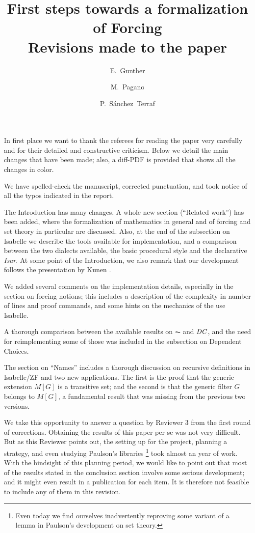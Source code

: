 \documentclass[11pt,english]{article}
\begin{document}
\title{First steps towards a formalization of Forcing
  \\ Revisions made to the paper}
\author{E.~Gunther \and  M.~Pagano \and P.~S\'anchez~Terraf
}
\date{}
\maketitle

In first place we want to thank the referees for reading the paper very
carefully and for their detailed and constructive criticism. Below we
detail the main changes that have been made; also, a diff-PDF is
provided that shows all the changes in color.

We have spelled-check the manuscript, corrected punctuation, and took
notice of all the typos indicated in the report. 

The Introduction has many changes. A whole new section (``Related
work'') has been added, where the formalization of mathematics in
general and of forcing and set theory in particular are discussed.
Also, at the end of the subsection on Isabelle we describe the tools
available for implementation, and a comparison
between the two dialects available, the basic procedural style and the
declarative \emph{Isar}. At some point of the Introduction, we also
remark that our 
development follows the presentation by Kunen \cite{kunen2011set}. 

We added several comments on the implementation details, especially in
the section on forcing notions; this includes a description of the
complexity in number of lines and proof commands, and some hints on
the mechanics of the use Isabelle.

A thorough comparison between the available results on $\AC$ and
$\mathit{DC}$, and the need for reimplementing some of those was included in
the subsection on Dependent Choices.

The section on ``Names'' includes a thorough discussion on recursive
definitions in Isabelle/ZF and two new applications. The first is the proof
that the generic extension $M[G]$ is a transitive set; and the second
is that the generic filter $G$ belongs to $M[G]$, a fundamental result
that was missing from the previous two versions.

We take this opportunity to answer a question by Reviewer 3 from the
first round of corrections. Obtaining the results of this paper per se
was not very difficult. But as this Reviewer points out, the setting
up for the project, planning a strategy, and even studying Paulson's
libraries%
\footnote{Even today we find ourselves inadvertently reproving some
  variant of a lemma in Paulson's development on set theory.}
took almost an year of work. With the hindsight of this planning
period, we would like to point out that most of the results stated in
the conclusion section involve some serious development; and it might
even result in a publication for each item. It is therefore not
feasible to include any of them in this revision.
%
%


\end{document}
